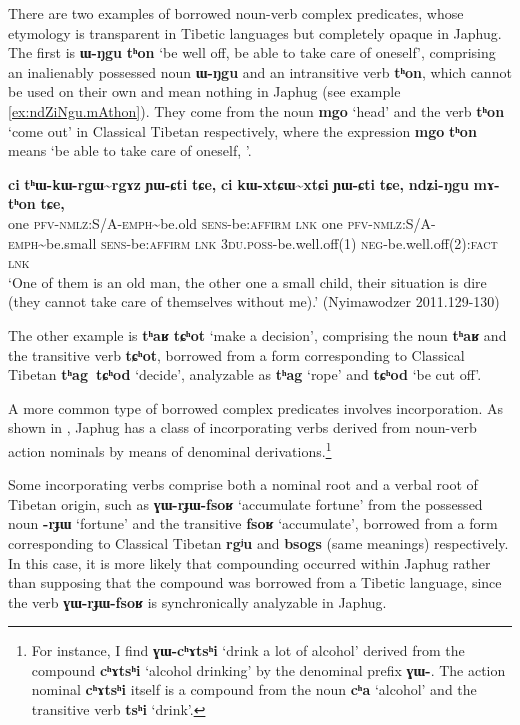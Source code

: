 \documentclass[oneside,a4paper,11pt]{article}
\newcommand{\ipa}[1]{{\phon\textbf{\mbox{#1}}}} %
\begin{document}
There are two examples of borrowed noun-verb complex predicates, whose etymology is transparent in Tibetic languages but completely opaque in Japhug. The first is \ipa{ɯ-ŋgu} \ipa{tʰon} `be well off, be able to take care of oneself', comprising an inalienably possessed noun \ipa{ɯ-ŋgu} and an intransitive verb \ipa{tʰon}, which cannot be used on their own and mean nothing in Japhug (see example \ref{ex:ndZiNgu.mAthon}). They come from the noun \ipa{mgo} `head' and the verb \ipa{tʰon} `come out' in Classical Tibetan respectively, where the expression \ipa{mgo} \ipa{tʰon} means `be able to take care of oneself, '.


\begin{exe}
\ex \label{ex:ndZiNgu.mAthon}
\gll
\ipa{ci}  	\ipa{tʰɯ-kɯ-rgɯ\textasciitilde{}rgɤz}  	\ipa{ɲɯ-ɕti}  	\ipa{tɕe,}  	\ipa{ci}  	\ipa{kɯ-xtɕɯ\textasciitilde{}xtɕi}  	\ipa{ɲɯ-ɕti}  	\ipa{tɕe,}  	\ipa{ndʑi-ŋgu}  	\ipa{mɤ-tʰon}  	\ipa{tɕe,}  	  \\
one \textsc{pfv-nmlz}:S/A-\textsc{emph}\textasciitilde{}be.old \textsc{sens}-be:\textsc{affirm} \textsc{lnk} one \textsc{pfv-nmlz}:S/A-\textsc{emph}\textasciitilde{}be.small \textsc{sens}-be:\textsc{affirm} \textsc{lnk} \textsc{3du.poss}-be.well.off(1) \textsc{neg}-be.well.off(2):\textsc{fact} \textsc{lnk} \\
\glt `One of them is an old man, the other one a small child, their situation is dire (they cannot take care of themselves without me).' (Nyimawodzer 2011.129-130)
\end{exe}  

The other example is \ipa{tʰaʁ} \ipa{tɕʰot} `make a decision', comprising the noun \ipa{tʰaʁ} and the transitive verb \ipa{tɕʰot}, borrowed from a form corresponding to Classical Tibetan  \ipa{tʰag tɕʰod} `decide', analyzable as \ipa{tʰag} `rope' and \ipa{tɕʰod} `be cut off'.

A more common type of borrowed complex predicates involves incorporation. As shown in \citet{jacques12incorp}, Japhug has a class of incorporating verbs derived from noun-verb action nominals by means of denominal derivations.\footnote{For instance, I find \ipa{ɣɯ-cʰɤtsʰi} `drink a lot of alcohol' derived from the compound \ipa{cʰɤtsʰi} `alcohol drinking' by the denominal prefix \ipa{ɣɯ-}. The action nominal \ipa{cʰɤtsʰi} itself is a compound from the noun \ipa{cʰa} `alcohol' and the transitive verb \ipa{tsʰi} `drink'.}

Some incorporating verbs comprise both a nominal root and a verbal root of Tibetan origin, such as \ipa{ɣɯ-rɟɯ-fsoʁ} `accumulate fortune' from the possessed noun \ipa{-rɟɯ} `fortune' and the transitive \ipa{fsoʁ} `accumulate', borrowed from a form corresponding to Classical Tibetan \ipa{rgʲu} and \ipa{bsogs} (same meanings) respectively. In this case, it is more likely that compounding occurred within Japhug rather than supposing that the compound was borrowed from a Tibetic language, since the verb \ipa{ɣɯ-rɟɯ-fsoʁ} is synchronically analyzable in Japhug.
\end{document}
